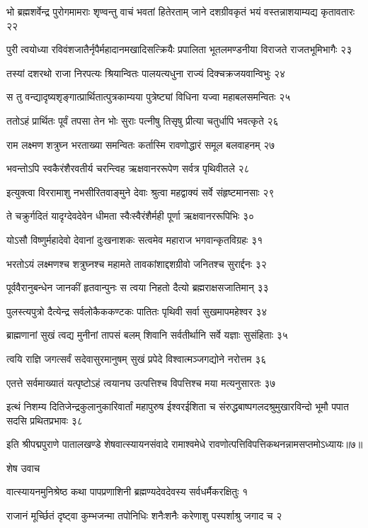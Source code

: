 भो ब्रह्मशर्वेन्द्र पुरोगमामराः शृण्वन्तु वाचं भवतां हितेरताम्
जाने दशग्रीवकृतं भयं वस्तन्नाशयाम्यद्य कृतावतारः २२

पुरी त्वयोध्या रविवंशजातैर्नृपैर्महादानमखादिसत्क्रियैः
प्रपालिता भूतलमण्डनीया विराजते राजतभूमिभागैः २३

तस्यां दशरथो राजा निरपत्यः श्रियान्वितः
पालयत्यधुना राज्यं दिक्चक्रजयवान्विभुः २४

स तु वन्द्यादृष्यशृङ्गात्प्रार्थितात्पुत्रकाम्यया
पुत्रेष्ट्यां विधिना यज्वा महाबलसमन्वितः २५

ततोऽहं प्रार्थितः पूर्वं तपसा तेन भोः सुराः
पत्नीषु तिसृषु प्रीत्या चतुर्धापि भवत्कृते २६

राम लक्ष्मण शत्रुघ्न भरताख्या समन्वितः
कर्तास्मि रावणोद्धारं समूल बलवाहनम् २७

भवन्तोऽपि स्वकैरंशैरवतीर्य चरन्त्विह
ऋक्षवानररूपेण सर्वत्र पृथिवीतले २८

इत्युक्त्वा विररामाशु नभसीरितवाङ्मुने
देवाः श्रुत्वा महद्वाक्यं सर्वे संहृष्टमानसाः २९

ते चक्रुर्गदितं यादृग्देवदेवेन धीमता
स्वैःस्वैरंशैर्मही पूर्णा ऋक्षवानररूपिभिः ३०

योऽसौ विष्णुर्महादेवो देवानां दुःखनाशकः
सत्वमेव महाराज भगवान्कृतविग्रहः ३१

भरतोऽयं लक्ष्मणश्च शत्रुघ्नश्च महामते
तावकांशाद्दशग्रीवो जनितश्च सुरार्द्दनः ३२

पूर्ववैरानुबन्धेन जानकीं हृतवान्पुनः
स त्वया निहतो दैत्यो ब्रह्मराक्षसजातिमान् ३३

पुलस्त्यपुत्रो दैत्येन्द्र सर्वलोकैककण्टकः
पातितः पृथिवी सर्वा सुखमापमहेश्वर ३४

ब्राह्मणानां सुखं त्वद्य मुनीनां तापसं बलम्
शिवानि सर्वतीर्थानि सर्वे यज्ञाः सुसंहिताः ३५

त्वयि राज्ञि जगत्सर्वं सदेवासुरमानुषम्
सुखं प्रपेदे विश्वात्मञ्जगद्योने नरोत्तम ३६

एतत्ते सर्वमाख्यातं यत्पृष्टोऽहं त्वयानघ
उत्पत्तिश्च विपत्तिश्च मया मत्यनुसारतः ३७

इत्थं निशम्य दितिजेन्द्रकुलानुकारिवार्तां महापुरुष ईश्वरईशिता च
संरुद्धबाष्पगलदश्रुमुखारविन्दो भूमौ पपात सदसि प्रथितप्रभावः ३८

इति श्रीपद्मपुराणे पातालखण्डे शेषवात्स्यायनसंवादे रामाश्वमेधे रावणोत्पत्तिविपत्तिकथनन्नामसप्तमोऽध्यायः॥७॥


शेष उवाच

वात्स्यायनमुनिश्रेष्ठ कथा पापप्रणाशिनी
ब्रह्मण्यदेवदेवस्य सर्वधर्मैकरक्षितुः १

राजानं मूर्च्छितं दृष्ट्वा कुम्भजन्मा तपोनिधिः
शनैःशनैः करेणाशु पस्पर्शाश्रु जगाद च २

